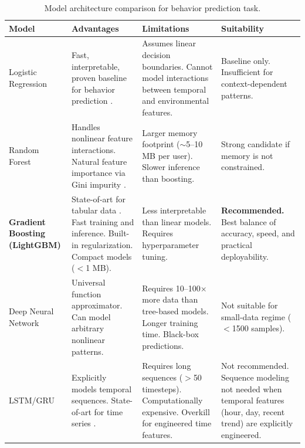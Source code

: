 \begin{table}[H]
    \centering
    \caption{Model architecture comparison for behavior prediction task.}
    \label{tab:model-selection-comparison}
    \renewcommand{\arraystretch}{1.3}
    \small
    \begin{tabularx}{\textwidth}{@{} >{\raggedright\arraybackslash}p{2.2cm} X X X @{}}
        \toprule
        \textbf{Model} & \textbf{Advantages} & \textbf{Limitations} & \textbf{Suitability} \\
        \midrule
        
        Logistic Regression &
        Fast, interpretable, proven baseline for behavior prediction \cite{richardson_predicting_2007}. &
        Assumes linear decision boundaries. Cannot model interactions between temporal and environmental features. &
        Baseline only. Insufficient for context-dependent patterns. \\
        
        Random Forest &
        Handles nonlinear feature interactions. Natural feature importance via Gini impurity \cite{breiman_random_2001}. &
        Larger memory footprint ($\sim$5--10 MB per user). Slower inference than boosting. &
        Strong candidate if memory is not constrained. \\
        
        \textbf{Gradient Boosting (LightGBM)} &
        State-of-art for tabular data \cite{ke_lightgbm_2017}. Fast training and inference. Built-in regularization. Compact models ($<$1 MB). &
        Less interpretable than linear models. Requires hyperparameter tuning. &
        \textbf{Recommended.} Best balance of accuracy, speed, and practical deployability. \\
        
        Deep Neural Network &
        Universal function approximator. Can model arbitrary nonlinear patterns. &
        Requires 10--100× more data than tree-based models. Longer training time. Black-box predictions. &
        Not suitable for small-data regime ($<$1500 samples). \\
        
        LSTM/GRU &
        Explicitly models temporal sequences. State-of-art for time series \cite{hochreiter_lstm_1997}. &
        Requires long sequences ($>$50 timesteps). Computationally expensive. Overkill for engineered time features. &
        Not recommended. Sequence modeling not needed when temporal features (hour, day, recent trend) are explicitly engineered. \\
        
        \bottomrule
    \end{tabularx}
\end{table}

